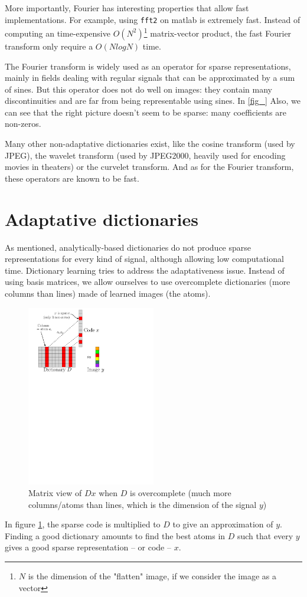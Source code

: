 More importantly, Fourier has interesting properties that allow fast implementations. For example, using \texttt{fft2} on matlab is extremely fast. Instead of computing an time-expensive $O(N^2)$\footnote{$N$ is the dimension of the "flatten" image, if we consider the image as a vector} matrix-vector product, the fast Fourier transform only require a $O(NlogN)$ time.

The Fourier transform is widely used as an operator for sparse representations, mainly in fields dealing with regular signals that can be approximated by a sum of sines. But this operator does not do well on images: they contain many discontinuities and are far from being representable using sines. In \ref{fig_} Also, we can see that the right picture doesn't seem to be sparse: many coefficients are non-zeros.

Many other non-adaptative dictionaries exist, like the cosine transform (used by JPEG), the wavelet transform (used by JPEG2000, heavily used for encoding movies in theaters) or the curvelet transform. And as for the Fourier transform, these operators are known to be fast.

\section{Adaptative dictionaries}
As mentioned, analytically-based dictionaries do not produce sparse representations for every kind of signal, although allowing low computational time. Dictionary learning tries to address the adaptativeness issue. Instead of using basis matrices, we allow ourselves to use overcomplete dictionaries (more columns than lines) made of learned images (the atoms).
\begin{figure}[!h] \centering
\includegraphics[width=0.5\textwidth]{figures/sparsity-matrix.pdf}
\caption{Matrix view of $Dx$ when $D$ is overcomplete (much more columns/atoms than lines, which is the dimension of the signal $y$) \label{fig_overcomplete_matrix}}
\end{figure}
In figure \ref{fig_overcomplete_matrix}, the sparse code is multiplied to $D$ to give an approximation of $y$. Finding a good dictionary amounts to find the best atoms in $D$ such that every $y$ gives a good sparse representation – or code – $x$.

